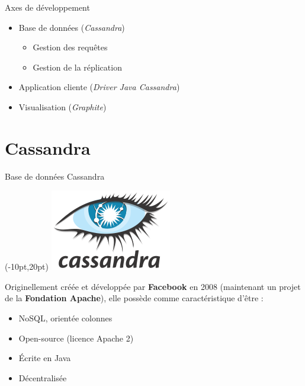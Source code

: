 \documentclass{beamer}
\begin{document}
\begin{frame}{Axes de développement}
\begin{itemize}
	\item Base de données (\textit{Cassandra})
	\begin{itemize}
		\item Gestion des requêtes
		\item Gestion de la réplication
	\end{itemize}
	\item Application cliente (\textit{Driver Java Cassandra})
	\item Visualisation (\textit{Graphite})
\end{itemize}
\end{frame}


\section{Cassandra}

\begin{frame}{Base de données Cassandra}
\begin{textblock*}{\paperwidth}(-10pt,20pt)
    \raggedleft \includegraphics[scale=0.2]{cassandra_logo}
\end{textblock*}
Originellement créée et développée par \textbf{Facebook} en 2008 (maintenant un projet de la \textbf{Fondation Apache}), elle possède comme caractéristique d'être :
\begin{itemize}
	\item NoSQL, orientée colonnes
	\item Open-source (licence Apache 2)
	\item Écrite en Java
	\item Décentralisée
\end{itemize}
\end{frame}
\end{document}
